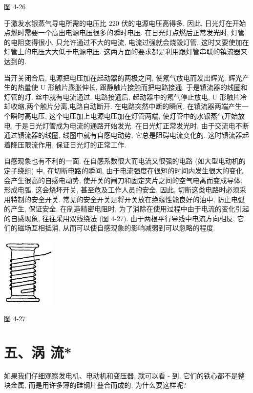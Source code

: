 \documentclass[10pt]{article}
\begin{document}
图 4-26

于激发水银蒸气导电所需的电压比 220 伏的电源电压高得多, 因此, 日光灯在开始点燃时需要一个高出电源电压很多的瞬时电压. 在日光灯点燃后正常发光时, 灯管的电阻变得很小, 只允许通过不大的电流, 电流过强就会烧毁灯管, 这时又要使加在灯管上的电压大大低于电源电压. 这两方面的要求都是利用跟灯管串联的镇流器来达到的.

当开关闭合后, 电源把电压加在起动器的两极之间, 使氖气放电而发出辉光. 辉光产生的热量使 \(\mathrm{U}\) 形触片膨胀伸长, 跟静触片接触而把电路接通. 于是镇流器的线圈和灯管的灯. 丝中就有电流通过. 电路接通后, 起动器中的氖气停止放电, \(\mathrm{U}\) 形触片冷却收缩,两个触片分离,电路自动断开. 在电路突然中断的瞬间, 在镇流器两端产生一个瞬时高电压, 这个电压加上电源电压加在灯管两端, 使灯管中的水银蒸气开始放电, 于是日光灯管成为电流的通路开始发光. 在日光灯正常发光时, 由于交流电不断通过镇流器的线圈, 线圈中就有自感电动势, 它总是阻碍电流变化的. 这时镇流器起着降压限流作用, 保证日光灯的正常工作.

自感现象也有不利的一面. 在自感系数很大而电流又很强的电路 (如大型电动机的定子绕组) 中, 在切断电路的瞬间, 由于电流强度在很短的时间内发生很大的变化, 会产生很高的自感电动势, 使开关的闸刀和固定夹片之间的空气电离而变成导体, 形成电弧. 这会烧坏开关, 甚至危及工作人员的安全. 因此, 切断这类电路时必须采用特制的安全开关. 常见的安全开关是将开关放在绝缘性能良好的油中, 防止电弧的产生, 保证安全. 在制造精密电阻时, 为了消除在使用过程中由于电流的变化引起的自感现象, 往往采用双线绕法 (图 4-27). 由于两根平行导线中电流方向相反, 它们的磁场互相抵消, 从而可以使自感现象的影响减弱到可以忽略的程度.

\begin{center}
\includegraphics[max width=0.2\textwidth]{images/01913056-1f15-74d8-9184-9aab52c9d66b_152_588677.jpg}
\end{center}

图 4-27

\section*{五、涡 流*}

如果我们仔细观察发电机、电动机和变压器, 就可以看 - 到, 它们的铁心都不是整块金属, 而是用许多薄的硅钢片叠合而成的. 为什么要这样呢?
\end{document}
